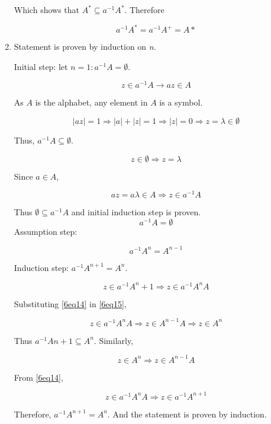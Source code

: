 \begin{enumerate}[label=(\alph*)]
	Which shows that $A^* \subseteq a^{-1}A^*$. Therefore

	\begin{equation}
	a^{-1}A^* = a^{-1}A^+ = A* \nonumber
	\end{equation}

	\item
	Statement is proven by induction on \textit{n}.

	Initial step: let $n = 1: a^{-1}A = \emptyset $.

	\begin{equation}
	z \in a^{-1}A \rightarrow az \in A
	\end{equation}

	As $A$ is the alphabet, any element in $A$ is a symbol.

	\begin{equation}
	|az| = 1 \Rightarrow |a| + |z| = 1 \Rightarrow |z| = 0 \Rightarrow z = \lambda \in \emptyset
	\end{equation}

	Thus, $a^{-1}A \subseteq \emptyset$.

	\begin{equation}
	z \in \emptyset \Rightarrow z = \lambda
	\end{equation}

	Since $a \in A$,

	\begin{equation}
	az = a\lambda \in A \Rightarrow z \in a^{-1}A
	\end{equation}

	Thus $\emptyset \subseteq a^{-1}A$ and initial induction step is proven.
	$$ a^{-1}A = \emptyset $$
	Assumption step:

	\begin{equation}\label{6eq14}
	a^{-1}A^n = A^{n-1}
	\end{equation}

	Induction step: $a^{-1}A^{n+1} = A^n$.

	\begin{equation}\label{6eq15}
	z \in a^{-1}A^n+1 \Rightarrow z \in a^{-1}A^nA
	\end{equation}

	Substituting \eqref{6eq14} in \eqref{6eq15},

	\begin{equation}
	z \in a^{-1}A^nA \Rightarrow z \in A^{n-1}A \Rightarrow z \in A^n
	\end{equation}

	Thus $a^{-1}A{n+1}\subseteq A^n$. Similarly,

	\begin{equation}
	z \in A^n \Rightarrow z \in A^{n-1}A
	\end{equation}

	From \eqref{6eq14},

	\begin{equation}
	z \in a^{-1}A^nA \Rightarrow z \in a^{-1}A^{n+1}
	\end{equation}

	Therefore, $a^{-1}A^{n+1}=A^n$. And the statement is proven by induction.

\end{enumerate}
